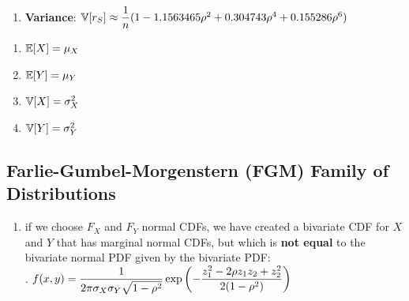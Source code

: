 \begin{enumerate}[series=binvar-normal]
\begin{enumerate}
        \item \textbf{Variance}:
        $
            \mathbb{V}[r_S]
            \approx \dfrac{1}{ n} (1 - 1.1563465\rho^2 + 0.304743\rho^4 + 0.155286\rho^6)
        $
        \hfill \cite{statistics/book/Statistics-for-Data-Scientists/Maurits-Kaptein}
    \end{enumerate}


\end{enumerate}


\begin{multicols}{2}
\begin{enumerate}[resume*=binvar-normal]
    \item $\mathbb{E}[X] = \mu_X$
    \hfill \cite{statistics/book/Statistics-for-Data-Scientists/Maurits-Kaptein}

    \item $\mathbb{E}[Y] = \mu_Y$
    \hfill \cite{statistics/book/Statistics-for-Data-Scientists/Maurits-Kaptein}

    \item $\mathbb{V}[X] = \sigma^2_X$
    \hfill \cite{statistics/book/Statistics-for-Data-Scientists/Maurits-Kaptein}

    \item $\mathbb{V}[Y] = \sigma^2_Y$
    \hfill \cite{statistics/book/Statistics-for-Data-Scientists/Maurits-Kaptein}
\end{enumerate}
\end{multicols}




\subsection{Farlie-Gumbel-Morgenstern (FGM) Family of Distributions}

\begin{enumerate}
    \item  if we choose $F_X$ and $F_Y$ normal CDFs, we have created a bivariate CDF for $X$ and $Y$ that has marginal normal CDFs, but which is \textbf{not equal} to the bivariate normal PDF given by the bivariate PDF:
    \hfill \cite{statistics/book/Statistics-for-Data-Scientists/Maurits-Kaptein}
    \\[0.3cm]
    .\hfill
    $
        f (x, y)
        = \dfrac{1}{ 2\pi\sigma_X \sigma_Y \sqrt{1 - \rho^2} }
        \exp \left(
            - \dfrac{z^2_1 - 2\rho z_1z_2 + z^2_2 }{2(1 - \rho^2)}
        \right)
    $
    \hfill \cite{statistics/book/Statistics-for-Data-Scientists/Maurits-Kaptein}
\end{enumerate}





